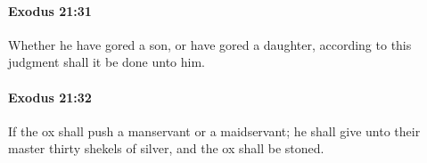 		\paragraph{Exodus 21:31} %
			\label{EXODUS-21-31}

			Whether he have gored a son, or have gored a daughter, according to this judgment shall it be done unto him.


		\paragraph{Exodus 21:32} %
			\label{EXODUS-21-32}

			If the ox shall push a manservant or a maidservant; he shall give unto their master thirty shekels of silver, and the ox shall be stoned.


